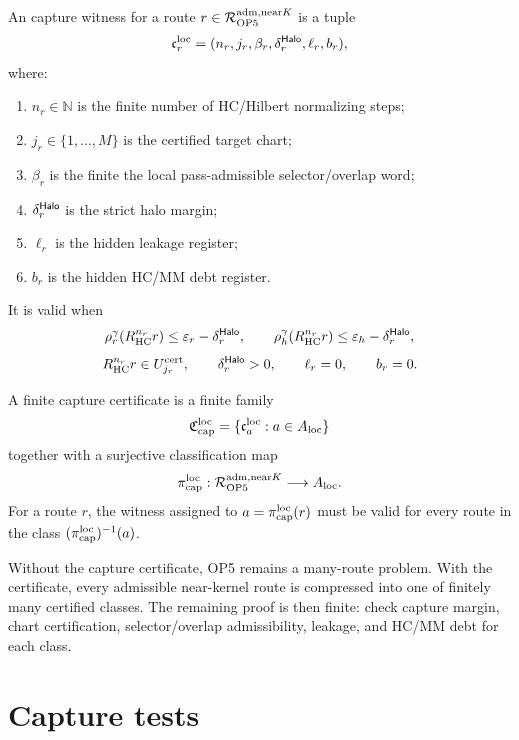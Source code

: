 \begin{definition}
An capture witness for a route \(r\in\mathcal R_{\mathrm{OP} 5}^{\mathrm{adm},\mathrm{near} K}\) is a tuple
\[
\mathfrak c_{r}^{\mathrm{loc}}
=
(n_r,j_r,\beta_r,
\delta_{r}^{\mathsf{Halo}},
\ell_r,b_r),
\]
where:
\begin{enumerate}[label=(\alph*)]
\item \(n_r\in\mathbb N\) is the finite number of HC/Hilbert normalizing steps;
\item \(j_r\in\{1,\ldots,M\}\) is the certified target chart;
\item \(\beta_r\) is the finite the local pass-admissible selector/overlap word;
\item \(\delta_{r}^{\mathsf{Halo}}\) is the strict halo margin;
\item \(\ell_r\) is the hidden leakage register;
\item \(b_r\) is the hidden HC/MM debt register.
\end{enumerate}
It is valid when
\[
\rho_{r}^{\gamma}(R_{\mathrm{HC}}^{n_r}r)\le \varepsilon_r-\delta_{r}^{\mathsf{Halo}},
\qquad
\rho_{h}^{\gamma}(R_{\mathrm{HC}}^{n_r}r)\le \varepsilon_h-\delta_{r}^{\mathsf{Halo}},
\]
\[
R_{\mathrm{HC}}^{n_r}r\in U_{j_r}^{\mathrm{cert}},
\qquad
\delta_{r}^{\mathsf{Halo}}>0,
\qquad
\ell_r=0,
\qquad
b_r=0.
\]
\end{definition}

\begin{definition}
A finite capture certificate is a finite family
\[
\mathfrak C_{\mathrm{cap}}^{\mathrm{loc}}
=
\{\mathfrak c_{a}^{\mathrm{loc}}:a\in A_{\mathrm{loc}}\}
\]
together with a surjective classification map
\[
\pi_{\mathrm{cap}}^{\mathrm{loc}}:\mathcal R_{\mathrm{OP} 5}^{\mathrm{adm},\mathrm{near} K}\longrightarrow A_{\mathrm{loc}}.
\]
For a route \(r\), the witness assigned to \(a=\pi_{\mathrm{cap}}^{\mathrm{loc}}(r)\) must be valid for every route in the class \((\pi_{\mathrm{cap}}^{\mathrm{loc}})^{-1}(a)\).
\end{definition}

\begin{remark}
Without the capture certificate, OP5 remains a many-route problem. With the certificate, every admissible near-kernel route is compressed into one of finitely many certified classes. The remaining proof is then finite: check capture margin, chart certification, selector/overlap admissibility, leakage, and HC/MM debt for each class.
\end{remark}

\section{Capture tests}

